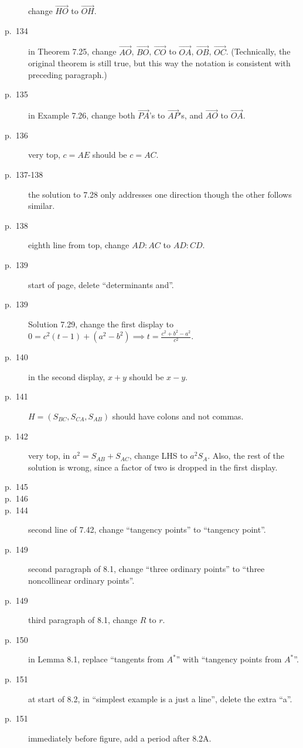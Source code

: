 \documentclass[11pt]{scrartcl}
\begin{document}
\begin{description}
  change $\overrightarrow{HO}$ to $\overrightarrow{OH}$.
\item[p.\  134] in Theorem 7.25, change
  $\overrightarrow{AO}$, $\overrightarrow{BO}$, $\overrightarrow{CO}$ to
  $\overrightarrow{OA}$, $\overrightarrow{OB}$, $\overrightarrow{OC}$.
  (Technically, the original theorem is still true,
  but this way the notation is consistent with preceding paragraph.)
\item[p.\  135] in Example 7.26, change both $\overrightarrow{PA}$'s to $\overrightarrow{AP}$'s,
  and $\overrightarrow{AO}$ to $\overrightarrow{OA}$.
\item[p.\  136] very top, $c=AE$ should be $c=AC$.
\item[p.\  137-138] the solution to 7.28 only addresses one direction
  though the other follows similar.
\item[p.\  138] eighth line from top, change $AD:AC$ to $AD:CD$.
\item[p.\  139] start of page, delete ``determinants and''.
\item[p.\  139] Solution 7.29, change the first display to
  $0 = c^2(t-1) + (a^2-b^2) \implies t = \frac{c^2+b^2-a^2}{c^2}$.
\item[p.\  140] in the second display, $x+y$ should be $x-y$.
\item[p.\  141] $H = (S_{BC},S_{CA},S_{AB})$ should have
  colons and not commas.
\item[p.\  142] very top, in $a^2=S_{AB}+S_{AC}$, change LHS to $a^2S_A$.
  Also, the rest of the solution is wrong, since a factor of two is dropped in the first display.
\item[p.\  145] 
\item[p.\  146] 
\item[p.\  144] second line of 7.42, change ``tangency points'' to ``tangency point''.
\item[p.\  149] second paragraph of 8.1, change ``three ordinary points''
  to ``three noncollinear ordinary points''.
\item[p.\  149] third paragraph of 8.1, change $R$ to $r$.
\item[p.\  150] in Lemma 8.1, replace ``tangents from $A^\ast$'' with ``tangency points from $A^\ast$''.
\item[p.\  151] at start of 8.2, in ``simplest example is a just a line'', delete the extra ``a''.
\item[p.\  151] immediately before figure, add a period after 8.2A.

\end{description}
\end{document}
